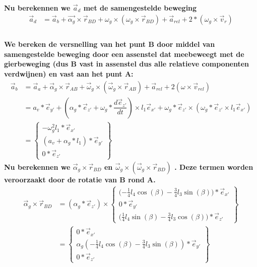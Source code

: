 \documentclass[a4paper,10pt]{article}
\begin{document}
\textbf{Nu berekennen we $\vec{a}_d$ met de samengestelde beweging}\\
\begin{equation}
	\begin{aligned}
		\vec{a}_d &= \vec{a}_b + \vec{\alpha_g} \times  \vec{r}_{BD} + \omega_g \times (\omega_g \times \vec{r}_{BD}) + \vec{a}_{rel} + 2* (\omega_g \times \vec{v}_r)\\
	\end{aligned}
\end{equation}
\\
\textbf{We bereken de versnelling van het punt B door middel van samengestelde beweging door een assenstel dat meebeweegt met de gierbeweging (dus B vast in assenstel dus alle relatieve componenten verdwijnen) en vast aan het punt A: }\\
\begin{equation}
\begin{aligned}
\vec{a}_b &= \vec{a}_a + \vec{\alpha}_g  \times \vec{r}_{AB} + \vec{\omega}_g \times (\vec{\omega}_g \times \vec{r}_{AB}) + \vec{a}_{rel} + 2(\omega \times \vec{v}_{rel})\\
&= a_v * \vec{e}_{y'} + (\alpha_g * \vec{e}_{z'} + \omega_g *\dfrac{d\vec{e}_{z'}}{dt}) \times l_1 \vec{e}_{x'} + \omega_{g} *\vec{e}_{z'} \times (\omega_{g} *\vec{e}_{z'}  \times l_1 \vec{e}_{x'})\\
& = \begin{Bmatrix}
-\omega^{2}_g l_1 * \vec{e}_{x'}\\
(a_v + \alpha_g * l_1)*\vec{e}_{y'}\\
0 * \vec{e}_{z'}
\end{Bmatrix}
\end{aligned}
\end{equation}
\textbf{Nu berekennen we $\vec{\alpha}_g \times \vec{r}_{BD}$ en $\vec{\omega}_g \times (\vec{\omega}_g \times \vec{r}_{BD})$ . Deze termen worden veroorzaakt door de rotatie van B rond A. }
\begin{equation}
\begin{aligned}
	\vec{\alpha}_g \times \vec{r}_{BD}  &= (\alpha_g * \vec{e}_{z'}) \times \begin{Bmatrix}
	\Big({-\frac{1}{4}} l_4 \cos(\beta)-\frac{3}{4} l_3 \sin(\beta)\Big)*\vec{e}_{x'}\\
	0 * \vec{e}_{y'}\\
	\Big (\frac{1}{4} l_4 \sin(\beta) - \frac{3}{4} l_3 \cos(\beta)\Big) * \vec{e}_{z'}
	\end{Bmatrix}\\
	&= \begin{Bmatrix}
	0*\vec{e}_{x'}\\
	\alpha_g ({-\frac{1}{4}} l_4 \cos(\beta)-\frac{3}{4} l_3 \sin(\beta))*\vec{e}_{y'}\\
	0*\vec{e}_{z'}
	\end{Bmatrix}
\end{aligned}
\end{equation}
\end{document}
